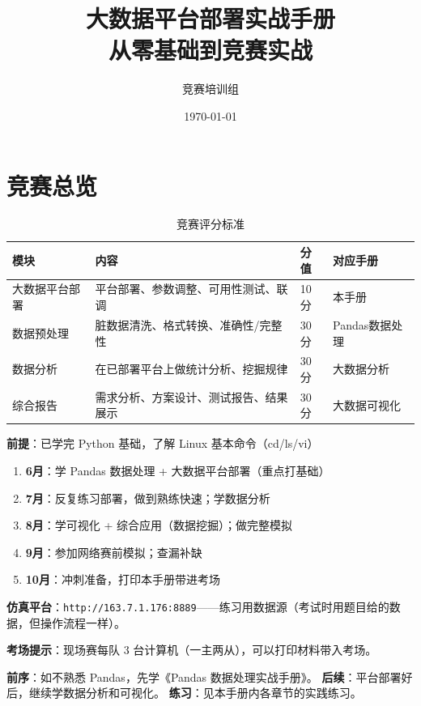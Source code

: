 \documentclass[12pt,a4paper]{article}
\title{\textbf{大数据平台部署实战手册}\\[0.5em]\large 从零基础到竞赛实战}
\author{竞赛培训组}
\date{\today}
\begin{document}
\maketitle

\section*{竞赛总览}

\begin{table}[H]
\centering
\caption{竞赛评分标准}
{\footnotesize
\begin{tabular}{llll}
\toprule
\textbf{模块} & \textbf{内容} & \textbf{分值} & \textbf{对应手册} \\
\midrule
大数据平台部署 & 平台部署、参数调整、可用性测试、联调 & 10分 & 本手册 \\
数据预处理 & 脏数据清洗、格式转换、准确性/完整性 & 30分 & Pandas数据处理 \\
数据分析 & 在已部署平台上做统计分析、挖掘规律 & 30分 & 大数据分析 \\
综合报告 & 需求分析、方案设计、测试报告、结果展示 & 30分 & 大数据可视化 \\
\bottomrule
\end{tabular}
}
\end{table}

\begin{tipbox}[准备计划（6-10月，约4个月）]

\textbf{前提}：已学完 Python 基础，了解 Linux 基本命令（cd/ls/vi）

\begin{enumerate}
    \item \textbf{6月}：学 Pandas 数据处理 + 大数据平台部署（重点打基础）
    \item \textbf{7月}：反复练习部署，做到熟练快速；学数据分析
    \item \textbf{8月}：学可视化 + 综合应用（数据挖掘）；做完整模拟
    \item \textbf{9月}：参加网络赛前模拟；查漏补缺
    \item \textbf{10月}：冲刺准备，打印本手册带进考场
\end{enumerate}

\textbf{仿真平台}：\texttt{http://163.7.1.176:8889}——练习用数据源（考试时用题目给的数据，但操作流程一样）。

\textbf{考场提示}：现场赛每队 3 台计算机（一主两从），可以打印材料带入考场。
\end{tipbox}

\begin{tipbox}[学习指引]
\textbf{前序}：如不熟悉 Pandas，先学《Pandas 数据处理实战手册》。
\textbf{后续}：平台部署好后，继续学数据分析和可视化。
\textbf{练习}：见本手册内各章节的实践练习。
\end{tipbox}
\end{document}
